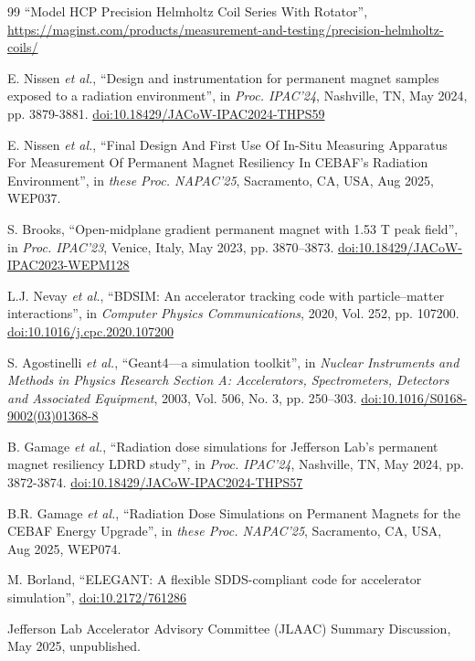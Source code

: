 \documentclass[a4paper,
               ]{jacow}
\begin{document}
{\begin{thebibliography}{99}
            \textquotedblleft{Model HCP Precision Helmholtz Coil Series With Rotator}\textquotedblright, \url{https://maginst.com/products/measurement-and-testing/precision-helmholtz-coils/}

            E. Nissen \emph{et al.},
            ``Design and instrumentation for permanent magnet samples exposed to a radiation environment'',
            in \emph{Proc. IPAC'24}, Nashville, TN, May 2024, pp. 3879-3881.
            \url{doi:10.18429/JACoW-IPAC2024-THPS59}

            E. Nissen \emph{et al.},
            ``Final Design And First Use Of In-Situ Measuring Apparatus For Measurement Of Permanent Magnet Resiliency In CEBAF’s Radiation Environment'',
            in \emph{these Proc. NAPAC'25}, Sacramento, CA, USA, Aug 2025, WEP037.

            S. Brooks,
            \textquotedblleft{Open-midplane gradient permanent magnet with 1.53 T peak field}\textquotedblright,
            in \emph{Proc. IPAC’23}, Venice, Italy, May 2023, pp. 3870--3873.
            \url{doi:10.18429/JACoW-IPAC2023-WEPM128}
 
            L.J. Nevay \emph{et al.},
            \textquotedblleft{BDSIM: An accelerator tracking code with particle–matter interactions}\textquotedblright,
            in \emph{Computer Physics Communications}, 2020, Vol. 252, pp. 107200.
            \url{doi:10.1016/j.cpc.2020.107200}

            S. Agostinelli \emph{et al.},
            \textquotedblleft{Geant4—a simulation toolkit}\textquotedblright,
            in \emph{Nuclear Instruments and Methods in Physics Research Section A: Accelerators, Spectrometers, Detectors and Associated Equipment}, 2003, Vol. 506, No. 3, pp. 250--303.
            \url{doi:10.1016/S0168-9002(03)01368-8}

              B. Gamage \emph{et al.},
            ``Radiation dose simulations for Jefferson Lab’s permanent magnet resiliency LDRD study'',
            in \emph{Proc. IPAC'24}, Nashville, TN, May 2024, pp. 3872-3874.
            \url{doi:10.18429/JACoW-IPAC2024-THPS57}

            B.R. Gamage \emph{et al.},
            ``Radiation Dose Simulations on Permanent Magnets for the CEBAF Energy Upgrade'',
            in \emph{these Proc. NAPAC'25}, Sacramento, CA, USA, Aug 2025, WEP074.

            M. Borland,
            \textquotedblleft{ELEGANT: A flexible SDDS-compliant code for accelerator simulation}\textquotedblright,
            \url{doi:10.2172/761286}

            Jefferson Lab Accelerator Advisory Committee (JLAAC) Summary Discussion, May 2025, unpublished.
        
	\end{thebibliography}
} %
%
% 

\end{document}
